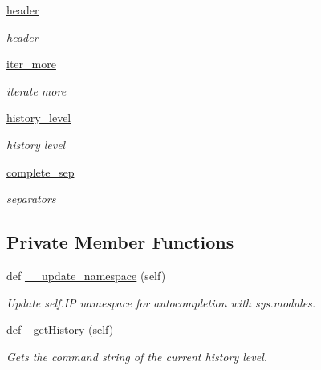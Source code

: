 \begin{DoxyCompactItemize}
\hyperlink{classvisualizer_1_1ipython__view_1_1IterableIPShell_a5e18bd395d355411a8bc3ed5980fa042}{header}
\begin{DoxyCompactList}\small\item\em header \end{DoxyCompactList}\item 
\hyperlink{classvisualizer_1_1ipython__view_1_1IterableIPShell_a672c44aacaf26dd57d01b7ec982c830b}{iter\+\_\+more}
\begin{DoxyCompactList}\small\item\em iterate more \end{DoxyCompactList}\item 
\hyperlink{classvisualizer_1_1ipython__view_1_1IterableIPShell_aa1139a5f349b9383401ee68e379cad32}{history\+\_\+level}
\begin{DoxyCompactList}\small\item\em history level \end{DoxyCompactList}\item 
\hyperlink{classvisualizer_1_1ipython__view_1_1IterableIPShell_aa4eb9a1d96f0a8dacb065fddead145f9}{complete\+\_\+sep}
\begin{DoxyCompactList}\small\item\em separators \end{DoxyCompactList}\end{DoxyCompactItemize}
\subsection*{Private Member Functions}
\begin{DoxyCompactItemize}
\item 
def \hyperlink{classvisualizer_1_1ipython__view_1_1IterableIPShell_a5316875355ee85fc5cbf15cce65dd276}{\+\_\+\+\_\+update\+\_\+namespace} (self)
\begin{DoxyCompactList}\small\item\em Update self.\+IP namespace for autocompletion with sys.\+modules. \end{DoxyCompactList}\item 
def \hyperlink{classvisualizer_1_1ipython__view_1_1IterableIPShell_a4e94f18672c36814399fd609eece7ae4}{\+\_\+get\+History} (self)
\begin{DoxyCompactList}\small\item\em Get\textquotesingle{}s the command string of the current history level. \end{DoxyCompactList}\end{DoxyCompactItemize}


